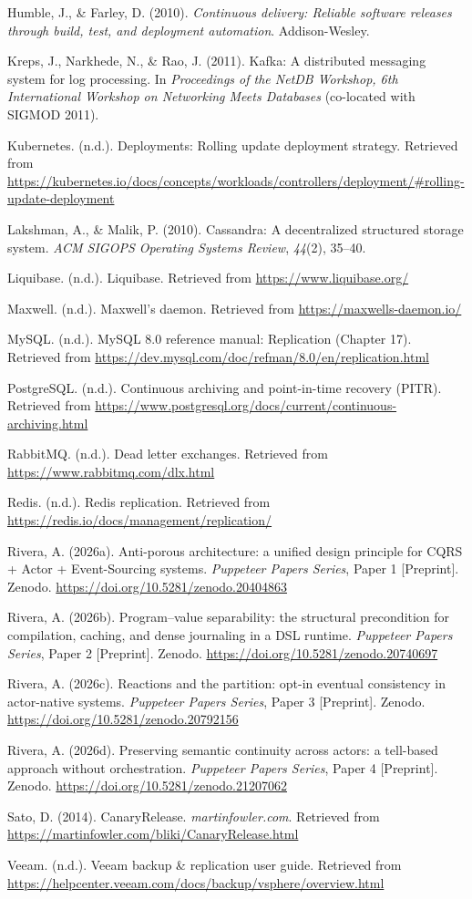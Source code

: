 \documentclass[
]{article}
\begin{document}
Humble, J., \& Farley, D. (2010). \emph{Continuous delivery: Reliable
software releases through build, test, and deployment automation}.
Addison-Wesley.

Kreps, J., Narkhede, N., \& Rao, J. (2011). Kafka: A distributed
messaging system for log processing. In \emph{Proceedings of the NetDB
Workshop, 6th International Workshop on Networking Meets Databases}
(co-located with SIGMOD 2011).

Kubernetes. (n.d.). Deployments: Rolling update deployment strategy.
Retrieved from
\url{https://kubernetes.io/docs/concepts/workloads/controllers/deployment/\#rolling-update-deployment}

Lakshman, A., \& Malik, P. (2010). Cassandra: A decentralized structured
storage system. \emph{ACM SIGOPS Operating Systems Review},
\emph{44}(2), 35--40.

Liquibase. (n.d.). Liquibase. Retrieved from
\url{https://www.liquibase.org/}

Maxwell. (n.d.). Maxwell's daemon. Retrieved from
\url{https://maxwells-daemon.io/}

MySQL. (n.d.). MySQL 8.0 reference manual: Replication (Chapter 17).
Retrieved from
\url{https://dev.mysql.com/doc/refman/8.0/en/replication.html}

PostgreSQL. (n.d.). Continuous archiving and point-in-time recovery
(PITR). Retrieved from
\url{https://www.postgresql.org/docs/current/continuous-archiving.html}

RabbitMQ. (n.d.). Dead letter exchanges. Retrieved from
\url{https://www.rabbitmq.com/dlx.html}

Redis. (n.d.). Redis replication. Retrieved from
\url{https://redis.io/docs/management/replication/}

Rivera, A. (2026a). Anti-porous architecture: a unified design principle
for CQRS + Actor + Event-Sourcing systems. \emph{Puppeteer Papers
Series}, Paper 1 {[}Preprint{]}. Zenodo.
\url{https://doi.org/10.5281/zenodo.20404863}

Rivera, A. (2026b). Program--value separability: the structural
precondition for compilation, caching, and dense journaling in a DSL
runtime. \emph{Puppeteer Papers Series}, Paper 2 {[}Preprint{]}. Zenodo.
\url{https://doi.org/10.5281/zenodo.20740697}

Rivera, A. (2026c). Reactions and the partition: opt-in eventual
consistency in actor-native systems. \emph{Puppeteer Papers Series},
Paper 3 {[}Preprint{]}. Zenodo.
\url{https://doi.org/10.5281/zenodo.20792156}

Rivera, A. (2026d). Preserving semantic continuity across actors: a
tell-based approach without orchestration. \emph{Puppeteer Papers
Series}, Paper 4 {[}Preprint{]}. Zenodo.
\url{https://doi.org/10.5281/zenodo.21207062}

Sato, D. (2014). CanaryRelease. \emph{martinfowler.com}. Retrieved from
\url{https://martinfowler.com/bliki/CanaryRelease.html}

Veeam. (n.d.). Veeam backup \& replication user guide. Retrieved from
\url{https://helpcenter.veeam.com/docs/backup/vsphere/overview.html}
\end{document}
